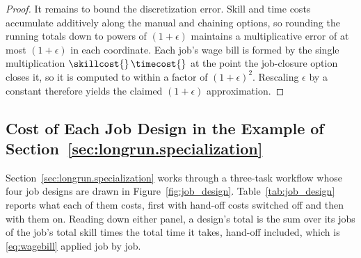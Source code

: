 \begin{proof}
It remains to bound the discretization error.
Skill and time costs accumulate additively along the manual and chaining options, so rounding the running totals down to powers of $(1+\epsilon)$ maintains a multiplicative error of at most $(1+\epsilon)$ in each coordinate.
Each job's wage bill is formed by the single multiplication $\skillcost{}\,\timecost{}$ at the point the job-closure option closes it, so it is computed to within a factor of $(1+\epsilon)^2$.
Rescaling $\epsilon$ by a constant therefore yields the claimed $(1+\epsilon)$ approximation.
\end{proof}

\subsection{Cost of Each Job Design in the Example of Section~\ref{sec:longrun.specialization}}
\label{app:jobdesign_example}

Section~\ref{sec:longrun.specialization} works through a three-task workflow whose four job designs are drawn in Figure~\ref{fig:job_design}.
Table~\ref{tab:job_design} reports what each of them costs, first with hand-off costs switched off and then with them on.
Reading down either panel, a design's total is the sum over its jobs of the job's total skill times the total time it takes, hand-off included, which is \eqref{eq:wagebill} applied job by job.

